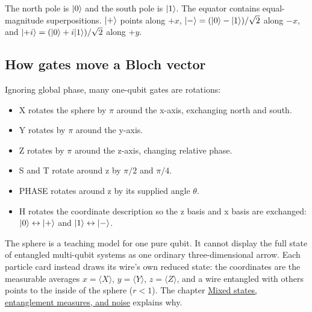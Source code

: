 The north pole is $\lvert 0\rangle$ and the south pole is $\lvert 1\rangle$. The equator contains
equal-magnitude superpositions. $\lvert +\rangle$ points along $+x$,
$\lvert -\rangle=(\lvert 0\rangle-\lvert 1\rangle)/\sqrt2$ along $-x$,
and $\lvert +i\rangle=(\lvert 0\rangle+i\lvert 1\rangle)/\sqrt2$ along $+y$.

\subsection{How gates move a Bloch vector}

Ignoring global phase, many one-qubit gates are rotations:
\begin{itemize}
  \item X rotates the sphere by $\pi$ around the x-axis, exchanging north and
  south.
  \item Y rotates by $\pi$ around the y-axis.
  \item Z rotates by $\pi$ around the z-axis, changing relative phase.
  \item S and T rotate around z by $\pi/2$ and $\pi/4$.
  \item PHASE rotates around z by its supplied angle $\theta$.
  \item H rotates the coordinate description so the z basis and x basis are
  exchanged: $\lvert 0\rangle\leftrightarrow\lvert +\rangle$ and
  $\lvert 1\rangle\leftrightarrow\lvert -\rangle$.
\end{itemize}
The sphere is a teaching model for one pure qubit. It cannot display the full
state of entangled multi-qubit systems as one ordinary three-dimensional arrow.
Each particle card instead draws its wire's own reduced state: the coordinates
are the measurable averages $x=\langle X\rangle$, $y=\langle Y\rangle$,
$z=\langle Z\rangle$, and a wire entangled with others points to the inside
of the sphere ($r<1$). The chapter \hyperlink{mixed-states}{Mixed states,
entanglement measures, and noise} explains why.

